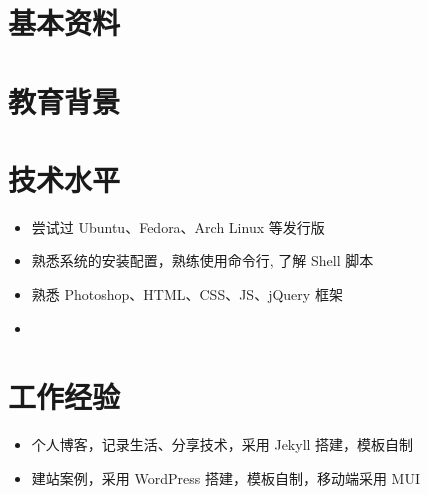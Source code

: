 \documentclass[12pt,a4paper]{moderncv}
\begin{document}
\maketitle

\section{\textbf {基本资料}}


\section{\textbf {教育背景}}


\section{\textbf {技术水平}}

  {  
    \begin{itemize}
    \item \small 尝试过 Ubuntu、Fedora、Arch Linux 等发行版
    \item \small 熟悉系统的安装配置，熟练使用命令行, 了解 Shell 脚本
    \end{itemize}
  }

  {  
    \begin{itemize}
    \item \small 熟悉 Photoshop、HTML、CSS、JS、jQuery 框架
    \item \small 
    \end{itemize}
  }

\section{\textbf {工作经验}}

  {  
    \begin{itemize}
    \item \small {} 个人博客，记录生活、分享技术，采用 Jekyll 搭建，模板自制
    \item \small {} 建站案例，采用 WordPress 搭建，模板自制，移动端采用 MUI
    \end{itemize}
  }
\end{document}
